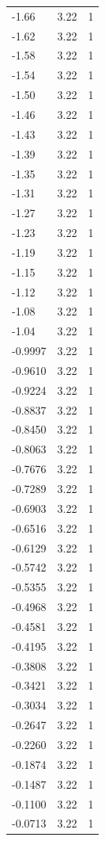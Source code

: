 \begin{longtable}{lrr}
  -1.66 & 3.22 & 1 \\
  -1.62 & 3.22 & 1 \\
  -1.58 & 3.22 & 1 \\
  -1.54 & 3.22 & 1 \\
  -1.50 & 3.22 & 1 \\
  -1.46 & 3.22 & 1 \\
  -1.43 & 3.22 & 1 \\
  -1.39 & 3.22 & 1 \\
  -1.35 & 3.22 & 1 \\
  -1.31 & 3.22 & 1 \\
  -1.27 & 3.22 & 1 \\
  -1.23 & 3.22 & 1 \\
  -1.19 & 3.22 & 1 \\
  -1.15 & 3.22 & 1 \\
  -1.12 & 3.22 & 1 \\
  -1.08 & 3.22 & 1 \\
  -1.04 & 3.22 & 1 \\
  -0.9997 & 3.22 & 1 \\
  -0.9610 & 3.22 & 1 \\
  -0.9224 & 3.22 & 1 \\
  -0.8837 & 3.22 & 1 \\
  -0.8450 & 3.22 & 1 \\
  -0.8063 & 3.22 & 1 \\
  -0.7676 & 3.22 & 1 \\
  -0.7289 & 3.22 & 1 \\
  -0.6903 & 3.22 & 1 \\
  -0.6516 & 3.22 & 1 \\
  -0.6129 & 3.22 & 1 \\
  -0.5742 & 3.22 & 1 \\
  -0.5355 & 3.22 & 1 \\
  -0.4968 & 3.22 & 1 \\
  -0.4581 & 3.22 & 1 \\
  -0.4195 & 3.22 & 1 \\
  -0.3808 & 3.22 & 1 \\
  -0.3421 & 3.22 & 1 \\
  -0.3034 & 3.22 & 1 \\
  -0.2647 & 3.22 & 1 \\
  -0.2260 & 3.22 & 1 \\
  -0.1874 & 3.22 & 1 \\
  -0.1487 & 3.22 & 1 \\
  -0.1100 & 3.22 & 1 \\
  -0.0713 & 3.22 & 1 \\

\end{longtable}
